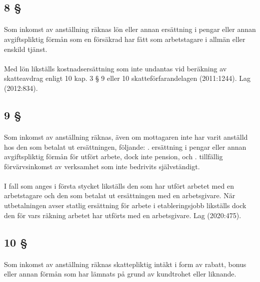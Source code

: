 \documentclass[a4paper,notitlepage,openany,10pt]{book}
\begin{document}
\subsection*{8 §}
\paragraph*{}
Som inkomst av anställning räknas lön eller annan ersättning i pengar eller annan avgiftspliktig förmån som en försäkrad har fått som arbetstagare i allmän eller enskild tjänst.
\paragraph*{}
Med lön likställs kostnadsersättning som inte undantas vid beräkning av skatteavdrag enligt 10 kap. 3 § 9 eller 10 skatteförfarandelagen (2011:1244).
Lag (2012:834).
\subsection*{9 §}
\paragraph*{}
Som inkomst av anställning räknas, även om mottagaren inte har varit anställd hos den som betalat ut ersättningen, följande:
. ersättning i pengar eller annan avgiftspliktig förmån för utfört arbete, dock inte pension, och
. tillfällig förvärvsinkomst av verksamhet som inte bedrivits självständigt.
\paragraph*{}
I fall som anges i första stycket likställs den som har utfört arbetet med en arbetstagare och den som betalat ut ersättningen med en arbetsgivare. När utbetalningen avser statlig ersättning för arbete i etableringsjobb likställs dock den för vars räkning arbetet har utförts med en arbetsgivare.
Lag (2020:475).
\subsection*{10 §}
\paragraph*{}
Som inkomst av anställning räknas skattepliktig intäkt i form av rabatt, bonus eller annan förmån som har lämnats på grund av kundtrohet eller liknande.
\end{document}
